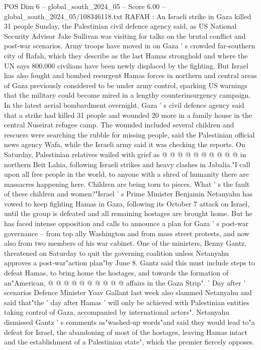\begin{textsample}{POS Dim 6 – global\_south\_2024\_05 – Score 6.00 – global\_south\_2024\_05/108346118.txt}  \label{ex:f6_pos_157}
RAFAH : An Israeli strike in Gaza killed 31 people Sunday, the Palestinian civil defence agency said, as US National Security Advisor Jake Sullivan was visiting for talks on the brutal conflict and post-war scenarios.
Army troops have moved in on Gaza ' s crowded far-southern city of Rafah, which they describe as the last Hamas stronghold and where the UN says 800,000 civilians have been newly displaced by the fighting.
But Israel has also fought and bombed resurgent Hamas forces in northern and central areas of Gaza previously considered to be under army control, sparking US warnings that the military could become mired in a lengthy counterinsurgency campaign.
In the latest aerial bombardment overnight, Gaza ' s civil defence agency said that a strike had killed 31 people and wounded 20 more in a family house in the central Nuseirat refugee camp.
The wounded included several children and rescuers were searching the rubble for missing people, said the Palestinian official news agency Wafa, while the Israeli army said it was checking the reports.
On Saturday, Palestinian relatives wailed with grief as @ @ @ @ @ @ @ @ @ @ in northern Beit Lahia, following Israeli strikes and heavy clashes in Jabalia."I call upon all free people in the world, to anyone with a shred of humanity there are massacres happening here.
Children are being torn to pieces.
What ' s the fault of these children and women?"Israel ' s Prime Minister Benjamin Netanyahu has vowed to keep fighting Hamas in Gaza, following its October 7 attack on Israel, until the group is defeated and all remaining hostages are brought home.
But he has faced intense opposition and calls to announce a plan for Gaza ' s post-war governance -- from top ally Washington and from mass street protests, and now also from two members of his war cabinet.
One of the ministers, Benny Gantz, threatened on Saturday to quit the governing coalition unless Netanyahu approves a post-war"action plan"by June 8.
Gantz said this must include steps to defeat Hamas, to bring home the hostages, and towards the formation of an"American, @ @ @ @ @ @ @ @ @ @ affairs in the Gaza Strip". ' Day after ' scenarios Defence Minister Yoav Gallant last week also slammed Netanyahu and said that"the ' day after Hamas ' will only be achieved with Palestinian entities taking control of Gaza, accompanied by international actors".
Netanyahu dismissed Gantz ' s comments as"washed-up words"and said they would lead to"a defeat for Israel, the abandoning of most of the hostages, leaving Hamas intact and the establishment of a Palestinian state", which the premier fiercely opposes.

\end{textsample}
